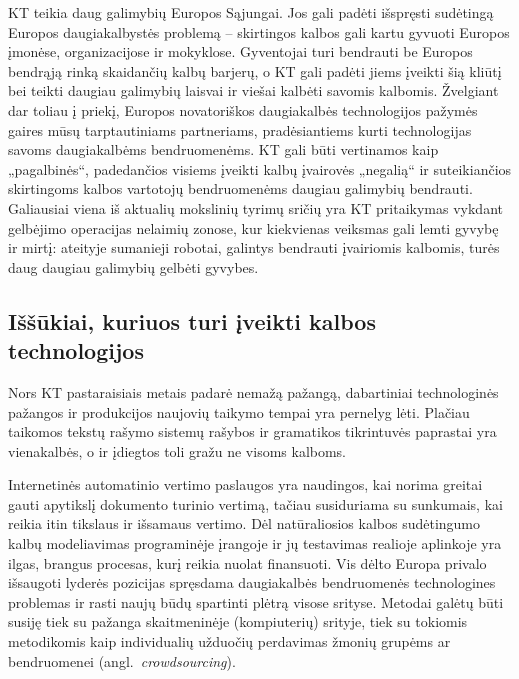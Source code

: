 \begin{multicols}{2}
KT teikia daug galimybių Europos Sąjungai. Jos gali padėti išspręsti sudėtingą Europos daugiakalbystės problemą – skirtingos kalbos gali kartu gyvuoti Europos įmonėse, organizacijose ir mokyklose. Gyventojai turi bendrauti be Europos bendrąją rinką skaidančių kalbų barjerų, o KT gali padėti jiems įveikti šią  kliūtį bei teikti daugiau galimybių laisvai ir viešai kalbėti savomis kalbomis. Žvelgiant dar toliau į priekį, Europos novatoriškos daugiakalbės technologijos pažymės gaires mūsų tarptautiniams partneriams, pradėsiantiems kurti technologijas savoms daugiakalbėms bendruomenėms. KT gali būti vertinamos kaip „pagalbinės“, padedančios visiems įveikti kalbų įvairovės „negalią“ ir suteikiančios skirtingoms kalbos vartotojų bendruomenėms daugiau galimybių bendrauti. Galiausiai viena iš aktualių mokslinių tyrimų sričių yra KT pritaikymas vykdant gelbėjimo operacijas nelaimių zonose, kur kiekvienas veiksmas gali lemti gyvybę ir mirtį: ateityje sumanieji robotai, galintys bendrauti įvairiomis kalbomis, turės daug daugiau galimybių gelbėti gyvybes. 

\subsection{Iššūkiai, kuriuos turi įveikti kalbos technologijos}

Nors KT pastaraisiais metais padarė nemažą pažangą, dabartiniai technologinės pažangos ir produkcijos naujovių taikymo tempai yra pernelyg lėti. Plačiau taikomos tekstų rašymo sistemų rašybos ir gramatikos tikrintuvės paprastai yra vienakalbės, o ir įdiegtos toli gražu ne visoms kalboms.


Internetinės automatinio vertimo paslaugos yra naudingos, kai norima greitai gauti apytikslį dokumento turinio vertimą, tačiau susiduriama su sunkumais, kai reikia itin tikslaus ir išsamaus vertimo. Dėl natūraliosios kalbos sudėtingumo kalbų modeliavimas programinėje įrangoje ir jų testavimas realioje aplinkoje yra ilgas, brangus procesas, kurį reikia nuolat finansuoti. Vis dėlto Europa privalo išsaugoti lyderės pozicijas spręsdama daugiakalbės bendruomenės technologines problemas ir rasti naujų būdų spartinti plėtrą visose srityse. Metodai galėtų būti susiję tiek su pažanga skaitmeninėje (kompiuterių) srityje, tiek su tokiomis metodikomis kaip individualių užduočių perdavimas žmonių grupėms ar bendruomenei (angl.~\textit{crowdsourcing}).


\end{multicols}
